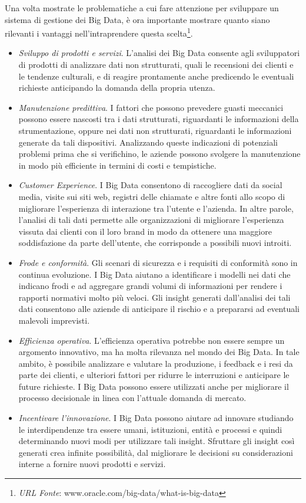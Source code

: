 Una volta mostrate le problematiche a cui fare attenzione per sviluppare un sistema di gestione dei Big Data, è ora importante mostrare quanto siano rilevanti i vantaggi nell'intraprendere questa scelta\footnote{\textit{URL Fonte}: www.oracle.com/big-data/what-is-big-data}.

\begin{itemize}
    \item \textit{Sviluppo di prodotti e servizi}. L'analisi dei Big Data consente agli sviluppatori di prodotti di analizzare dati non strutturati, quali le recensioni dei clienti e le tendenze culturali, e di reagire prontamente anche predicendo le eventuali richieste anticipando la domanda della propria utenza.
    \item \textit{Manutenzione predittiva}. I fattori che possono prevedere guasti meccanici possono essere nascosti tra i dati strutturati, riguardanti le informazioni della strumentazione, oppure nei dati non strutturati, riguardanti le informazioni generate da tali dispositivi. Analizzando queste indicazioni di potenziali problemi prima che si verifichino, le aziende possono svolgere la manutenzione in modo più efficiente in termini di costi e tempistiche.
    \item \textit{Customer Experience}. I Big Data consentono di raccogliere dati da social media, visite sui siti web, registri delle chiamate e altre fonti allo scopo di migliorare l'esperienza di interazione tra l'utente e l'azienda. In altre parole, l'analisi di tali dati permette alle organizzazioni di migliorare l'esperienza vissuta dai clienti con il loro brand in modo da ottenere una maggiore soddisfazione da parte dell'utente, che corrisponde a possibili nuovi introiti.
    \item \textit{Frode e conformità}. Gli scenari di sicurezza e i requisiti di conformità sono in continua evoluzione. I Big Data aiutano a identificare i modelli nei dati che indicano frodi e ad aggregare grandi volumi di informazioni per rendere i rapporti normativi molto più veloci. Gli insight generati dall'analisi dei tali dati consentono alle aziende di anticipare il rischio e a prepararsi ad eventuali malevoli imprevisti.
    \item \textit{Efficienza operativa}. L'efficienza operativa potrebbe non essere sempre un argomento innovativo, ma ha molta rilevanza nel mondo dei Big Data. In tale ambito, è possibile analizzare e valutare la produzione, i feedback e i resi da parte dei clienti, e ulteriori fattori per ridurre le interruzioni e anticipare le future richieste. I Big Data possono essere utilizzati anche per migliorare il processo decisionale in linea con l'attuale domanda di mercato.
    \item \textit{Incentivare l'innovazione}. I Big Data possono aiutare ad innovare studiando le interdipendenze tra essere umani, istituzioni, entità e processi e quindi determinando nuovi modi per utilizzare tali insight. Sfruttare gli insight così generati crea infinite possibilità, dal migliorare le decisioni su considerazioni interne a fornire nuovi prodotti e servizi.
\end{itemize}

